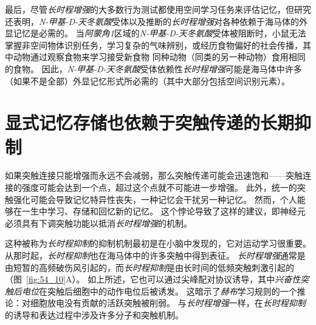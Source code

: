 最后，尽管\textit{长时程增强}的大多数行为测试都使用空间学习任务来评估记忆，但研究还表明，\textit{N-甲基-D-天冬氨酸}受体以及推断的\textit{长时程增强}对各种依赖于海马体的外显记忆是必需的。
当\textit{阿蒙角1}区域的\textit{N-甲基-D-天冬氨酸}受体被阻断时，小鼠无法掌握非空间物体识别任务，学习复杂的气味辨别，或经历食物偏好的社会传播，其中动物通过观察食物来学习接受新食物 同种动物（同类的另一种动物）食用相同的食物。
因此，\textit{N-甲基-D-天冬氨酸}受体依赖性\textit{长时程增强}可能是海马体中许多（如果不是全部）外显记忆形式所必需的（其中大部分包括空间识别元素）。



\section{显式记忆存储也依赖于突触传递的长期抑制}

如果突触连接只能增强而永远不会减弱，那么突触传递可能会迅速饱和——突触连接的强度可能会达到一个点，超过这个点就不可能进一步增强。
此外，统一的突触强化可能会导致记忆特异性丧失，一种记忆会干扰另一种记忆。
然而，个人能够在一生中学习、存储和回忆新的记忆。
这个悖论导致了这样的建议，即神经元必须具有下调突触功能以抵消\textit{长时程增强}的机制。


这种被称为\textit{长时程抑制}的抑制机制最初是在小脑中发现的，它对运动学习很重要。
从那时起，\textit{长时程抑制}也在海马体中的许多突触中得到表征。
\textit{长时程增强}通常是由短暂的高频破伤风引起的，而\textit{长时程抑制}是由长时间的低频突触刺激引起的（图~\ref{fig:54_10}A）。
如上所述，它也可以通过尖峰配对协议诱导，其中\textit{兴奋性突触后电位}在突触后细胞中的动作电位后被诱发。
这暗示了\textit{赫布}学习规则的一个推论：对细胞放电没有贡献的活跃突触被削弱。
与\textit{长时程增强}一样，在\textit{长时程抑制}的诱导和表达过程中涉及许多分子和突触机制。


